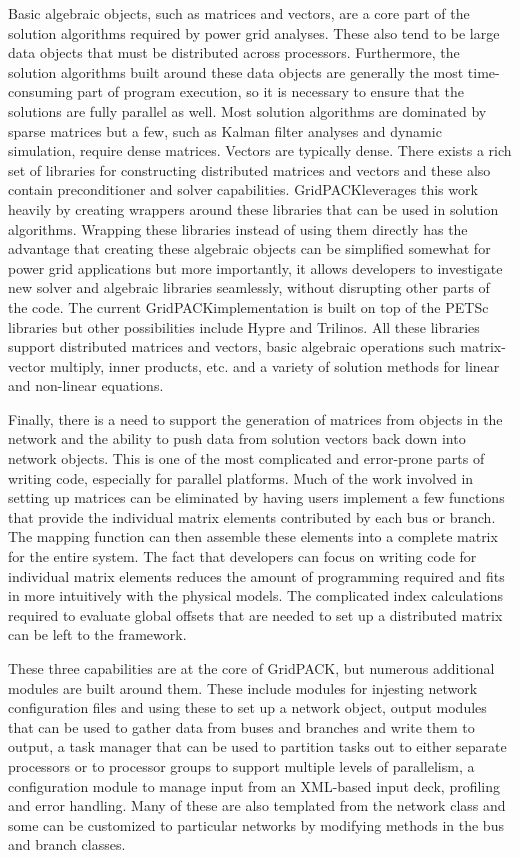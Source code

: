 \documentclass[preprint]{acm_proc_article-sp}
\begin{document}
Basic algebraic objects, such as matrices and vectors, are a core part
of the solution algorithms required by power grid analyses. These also tend to
be large data objects that must be distributed across processors. Furthermore,
the solution algorithms built around these data objects are generally the most
time-consuming part of program execution, so it is necessary to ensure that the
solutions are fully parallel as well. Most solution algorithms
are dominated by sparse matrices but a few, such as Kalman filter
analyses\cite{KAL} and dynamic simulation\cite{DS}, require dense
matrices. Vectors are typically dense. There exists a rich set of libraries for
constructing distributed matrices and vectors and these also contain preconditioner
and solver capabilities.  GridPACK\texttrademark leverages this work heavily by
creating wrappers around these libraries that can be used in solution
algorithms. Wrapping these libraries instead of using them directly has the
advantage that creating these algebraic objects can be simplified somewhat for power grid
applications but more importantly, it allows developers to investigate new
solver and algebraic libraries seamlessly, without disrupting other parts of the code.
The current GridPACK\texttrademark implementation is built on top of the
PETSc\cite{PETSC}
libraries but other possibilities include Hypre\cite{HYPRE} and
Trilinos\cite{TRIL}. All these
libraries support distributed matrices and vectors, basic algebraic operations
such matrix-vector multiply, inner products, etc. and a variety of solution
methods for linear and non-linear equations.

Finally, there is a need to support the generation of matrices from objects in the
network and the ability to push data from solution vectors back down into
network objects. This is one of the most complicated and error-prone parts of
writing code, especially for parallel platforms. Much of the work involved in
setting up matrices can be eliminated by having users implement a few functions
that provide the individual matrix elements contributed by each bus or branch. The
mapping function can then assemble these elements into a complete matrix for the
entire system. The fact that developers can focus on writing code for individual
matrix elements reduces the amount of programming required and fits in more
intuitively with the physical models. The complicated index calculations
required to evaluate global offsets that are needed to set up a distributed
matrix can be left to the framework.

These three capabilities are at the core of GridPACK\texttrademark, but numerous
additional modules are built around them. These include modules for injesting
network configuration files and using these to set up a network object, output
modules that can be used to gather data from buses and branches and write them
to output, a task manager that can be used to partition tasks out to either separate
processors or to processor groups to support multiple levels of parallelism, a
configuration module to manage input from an XML-based input deck, profiling and
error handling. Many of these are also templated from the network class  and
some can be customized to particular networks by modifying methods in the bus
and branch classes.
\end{document}
